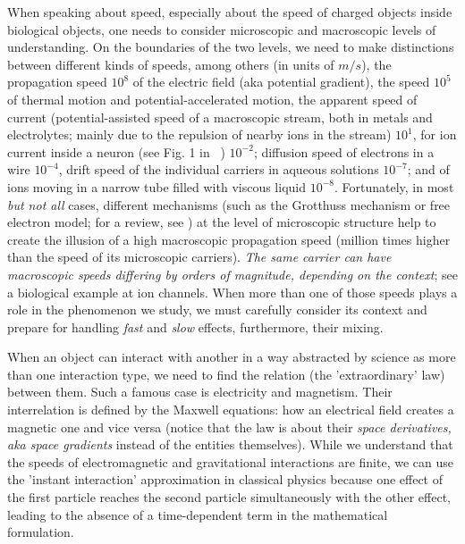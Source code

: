 When speaking about speed, especially about the speed of charged objects
inside biological objects, one needs to consider microscopic and macroscopic
levels of understanding. On the boundaries of the two levels, we need
to make distinctions between different kinds of speeds, among others
(in units of $m/s$), the propagation speed $10^{8}$ of the electric
field (aka potential gradient), the speed $10^{5}$ of thermal motion and potential-accelerated motion, the
apparent speed of current (potential-assisted speed of a macroscopic stream, both
in metals and electrolytes; mainly due to the repulsion of nearby ions in the stream) $10^{1}$,
 for ion current inside a neuron
(see Fig. 1 in ~\cite{ActionPotentialGenerationNatrium:2008}) $10^{-2}$;
diffusion speed of electrons in a wire $10^{-4}$, drift speed
 of the individual carriers in aqueous solutions $10^{-7}$; and
of ions moving in a narrow tube filled with viscous liquid $10^{-8}$. Fortunately,
in most \textit{but not all} cases, different mechanisms
(such as the Grotthuss mechanism or free electron model; for a review,
see \cite{GrotthussMechanism:2023}) at the level of microscopic
structure help to create the illusion of a high macroscopic propagation
speed (million times higher than the speed of its microscopic carriers).
\textit{The same carrier can have macroscopic speeds differing by orders of
magnitude, depending on the context};  see a biological example at
{ion channels}.
When more than one of those
speeds plays a role in the phenomenon we study, we must carefully
consider its context and prepare for handling \textit{fast}
and \textit{slow} effects, furthermore, their mixing.


When an object can interact with another in a way abstracted by science
as more than one interaction type, we need to find the relation (the 'extraordinary' law) between
them. Such a famous case is electricity and magnetism.
 Their interrelation
is defined by the Maxwell equations: how an electrical field creates
a magnetic one and vice versa (notice that the law is about their
\emph{space derivatives, aka space gradients} instead of the entities themselves). 
While we understand that the speeds of electromagnetic and gravitational
interactions are finite, we can use the 'instant interaction' approximation
in classical physics because one effect of the first particle
reaches the second particle simultaneously with the other effect,
leading to the absence of a time-dependent term in the mathematical
formulation.

